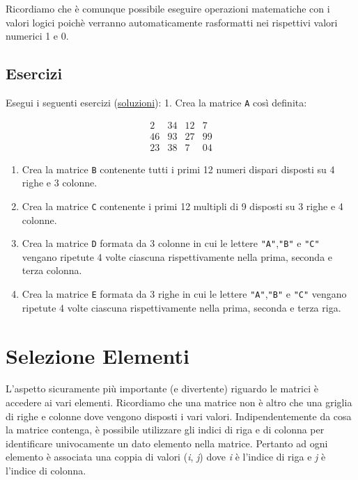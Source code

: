 \documentclass[
]{book}
\providecommand{\tightlist}{%
  \setlength{\itemsep}{0pt}\setlength{\parskip}{0pt}}
\begin{document}
Ricordiamo che è comunque possibile eseguire operazioni matematiche con i valori logici poichè verranno automaticamente rasformatti nei rispettivi valori numerici 1 e 0.

\hypertarget{esercizi-6}{%
\subsection*{Esercizi}\label{esercizi-6}}

Esegui i seguenti esercizi (\href{https://github.com/psicostat/Introduction2R/blob/master/exercises/chapter-09.R}{soluzioni}):
1. Crea la matrice \texttt{A} così definita:

\[
\begin{matrix}
2 & 34 & 12 & 7\\
46 & 93 & 27 & 99\\
23  & 38 & 7 & 04
\end{matrix}
\]

\begin{enumerate}
\def\labelenumi{\arabic{enumi}.}
\setcounter{enumi}{1}
\tightlist
\item
  Crea la matrice \texttt{B} contenente tutti i primi 12 numeri dispari disposti su 4 righe e 3 colonne.
\item
  Crea la matrice \texttt{C} contenente i primi 12 multipli di 9 disposti su 3 righe e 4 colonne.
\item
  Crea la matrice \texttt{D} formata da 3 colonne in cui le lettere \texttt{"A"},\texttt{"B"} e \texttt{"C"} vengano ripetute 4 volte ciascuna rispettivamente nella prima, seconda e terza colonna.
\item
  Crea la matrice \texttt{E} formata da 3 righe in cui le lettere \texttt{"A"},\texttt{"B"} e \texttt{"C"} vengano ripetute 4 volte ciascuna rispettivamente nella prima, seconda e terza riga.
\end{enumerate}

\hypertarget{sel-matrix}{%
\section{Selezione Elementi}\label{sel-matrix}}

L'aspetto sicuramente più importante (e divertente) riguardo le matrici è accedere ai vari elementi. Ricordiamo che una matrice non è altro che una griglia di righe e colonne dove vengono disposti i vari valori. Indipendentemente da cosa la matrice contenga, è possibile utilizzare gli indici di riga e di colonna per identificare univocamente un dato elemento nella matrice. Pertanto ad ogni elemento è associata una coppia di valori (\emph{i}, \emph{j}) dove \emph{i} è l'indice di riga e \emph{j} è l'indice di colonna.
\end{document}
